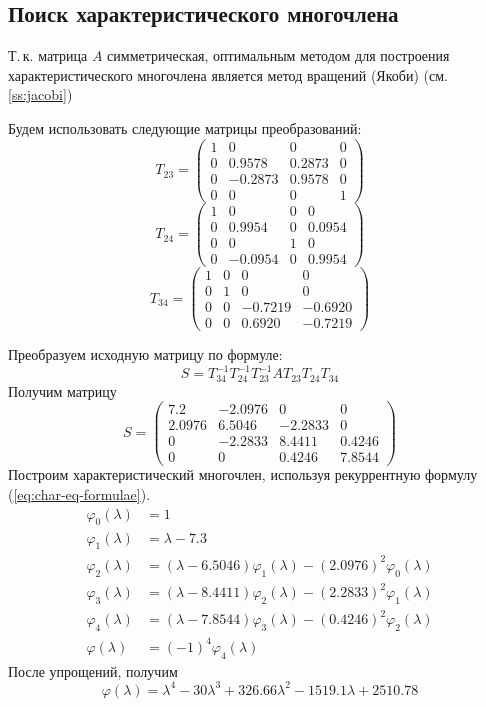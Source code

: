 \documentclass[a4paper,12pt,notitlepage,pdftex,headsepline]{scrartcl}
\begin{document}
\subsection{Поиск характеристического многочлена}
Т.\,к. матрица $A$ симметрическая, оптимальным методом для построения характеристического многочлена является метод вращений (Якоби) (см. \ref{ss:jacobi})

Будем использовать следующие матрицы преобразований:
\[T_{23} = \left(\begin{matrix}
1 & 0 & 0 & 0\\
0 & 0.9578 & 0.2873 & 0\\
0 & -0.2873 & 0.9578 & 0\\
0 & 0 & 0 & 1
\end{matrix}\right)\]
\[
T_{24} = \left(
\begin{matrix}
1 & 0 & 0 & 0\\
0 & 0.9954 & 0 & 0.0954\\
0 & 0 & 1 & 0\\
0 & -0.0954 & 0 & 0.9954
\end{matrix}
\right)
\]
\[
T_{34} = \left(
\begin{matrix}
1 & 0 & 0 & 0\\
0 & 1 & 0 & 0\\
0 & 0 & -0.7219 & -0.6920\\
0 & 0 & 0.6920 & -0.7219
\end{matrix}
\right)
\]

Преобразуем исходную матрицу по формуле:
$$S = T_{34}^{-1} T_{24}^{-1} T_{23}^{-1} A T_{23} T_{24} T_{34}$$
Получим матрицу
\[
S = \left(
\begin{matrix}
7.2 & -2.0976 & 0 & 0\\
2.0976 & 6.5046 & -2.2833 & 0\\
0 & -2.2833  &  8.4411 & 0.4246\\
0 & 0 & 0.4246  & 7.8544
\end{matrix}
\right)
\]
Построим характеристический многочлен, используя рекуррентную формулу (\ref{eq:char-eq-formulae}).
\[
\begin{aligned}
\varphi_0\left(\lambda\right) &= 1\\
\varphi_1\left(\lambda\right) &= \lambda - 7.3\\
\varphi_2\left(\lambda\right) &= \left(\lambda - 6.5046\right)\varphi_1\left(\lambda\right) - (2.0976)^2 \varphi_0\left(\lambda\right)\\
\varphi_3\left(\lambda\right) &= \left(\lambda - 8.4411\right)\varphi_2\left(\lambda\right) - (2.2833)^2 \varphi_1\left(\lambda\right)\\
\varphi_4\left(\lambda\right) &= \left(\lambda - 7.8544\right)\varphi_3\left(\lambda\right) - (0.4246)^2 \varphi_2\left(\lambda\right)\\
\varphi\left(\lambda\right) &= (-1)^4 \varphi_4\left(\lambda\right)
\end{aligned}
\]
После упрощений, получим
\[
\varphi\left(\lambda\right) = \lambda^4 - 30 \lambda^3 + 326.66\lambda^2 -1519.1\lambda + 2510.78
\]
\end{document}
